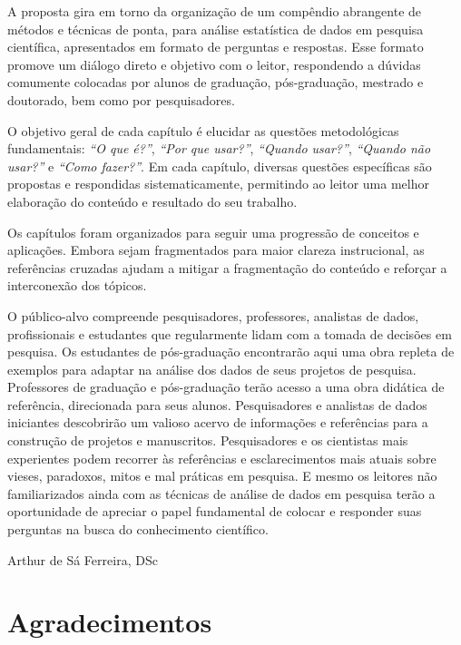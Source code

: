 \documentclass[
]{book}
\begin{document}
A proposta gira em torno da organização de um compêndio abrangente de métodos e técnicas de ponta, para análise estatística de dados em pesquisa científica, apresentados em formato de perguntas e respostas. Esse formato promove um diálogo direto e objetivo com o leitor, respondendo a dúvidas comumente colocadas por alunos de graduação, pós-graduação, mestrado e doutorado, bem como por pesquisadores.

O objetivo geral de cada capítulo é elucidar as questões metodológicas fundamentais: \emph{``O que é?''}, \emph{``Por que usar?''}, \emph{``Quando usar?''}, \emph{``Quando não usar?''} e \emph{``Como fazer?''}. Em cada capítulo, diversas questões específicas são propostas e respondidas sistematicamente, permitindo ao leitor uma melhor elaboração do conteúdo e resultado do seu trabalho.

Os capítulos foram organizados para seguir uma progressão de conceitos e aplicações. Embora sejam fragmentados para maior clareza instrucional, as referências cruzadas ajudam a mitigar a fragmentação do conteúdo e reforçar a interconexão dos tópicos.

O público-alvo compreende pesquisadores, professores, analistas de dados, profissionais e estudantes que regularmente lidam com a tomada de decisões em pesquisa. Os estudantes de pós-graduação encontrarão aqui uma obra repleta de exemplos para adaptar na análise dos dados de seus projetos de pesquisa. Professores de graduação e pós-graduação terão acesso a uma obra didática de referência, direcionada para seus alunos. Pesquisadores e analistas de dados iniciantes descobrirão um valioso acervo de informações e referências para a construção de projetos e manuscritos. Pesquisadores e os cientistas mais experientes podem recorrer às referências e esclarecimentos mais atuais sobre vieses, paradoxos, mitos e mal práticas em pesquisa. E mesmo os leitores não familiarizados ainda com as técnicas de análise de dados em pesquisa terão a oportunidade de apreciar o papel fundamental de colocar e responder suas perguntas na busca do conhecimento científico.

Arthur de Sá Ferreira, DSc

\hypertarget{agradecimentos}{%
\chapter*{Agradecimentos}\label{agradecimentos}}

\markboth{}{}
\end{document}
